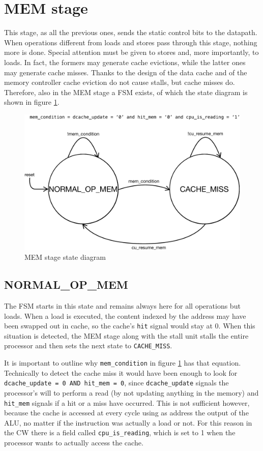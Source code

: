 \section{MEM stage}
\label{sec:cache_handling}

This stage, as all the previous ones, sends the static control bits to the datapath. When operations different from loads and stores pass through this stage, nothing more is done. Special attention must be
given to stores and, more importantly, to loads. In fact, the formers may generate cache evictions, while the latter ones may generate cache misses. Thanks to the design of the data cache and of the memory controller
cache eviction do not cause stalls, but cache misses do. Therefore, also in the MEM stage a FSM exists, of which the state diagram is shown in figure \ref{fig:mem_fsm}.

\begin{figure}[!ht]
	\centering
	\includegraphics[width=0.5\linewidth]{./chapters/figures/mem_fsm.pdf}
    \caption{MEM stage state diagram}
    \label{fig:mem_fsm}
\end{figure}

\subsection{NORMAL\_OP\_MEM}

The FSM starts in this state and remains always here for all operations but loads. When a load is executed, the content indexed by the address may have been swapped out in cache, so the cache's \verb|hit| signal
would stay at 0. When this situation is detected, the MEM stage along with the stall unit stalls the entire processor and then sets the next state to \verb|CACHE_MISS|.

It is important to outline why \verb|mem_condition| in figure \ref{fig:mem_fsm} has that equation. Technically to detect the cache miss it would have been enough to look for \verb|dcache_update = 0 AND hit_mem = 0|, since
\verb|dcache_update| signals the processor's will to perform a read (by not updating anything in the memory) and \verb|hit_mem| signals if a hit or a miss have occurred. This is not sufficient however, because the cache is
accessed at every cycle using as address the output of the ALU, no matter if the instruction was actually a load or not. For this reason in the CW there is a field called \verb|cpu_is_reading|, which is set to 1 when the
processor wants to actually access the cache.


